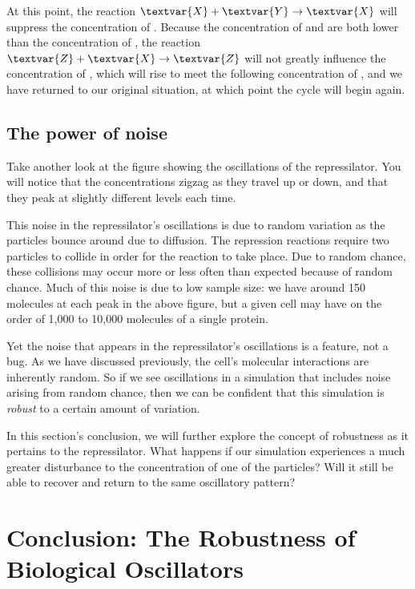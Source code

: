 At this point, the reaction $\textvar{X} + \textvar{Y} \rightarrow \textvar{X}$ will suppress the concentration of . Because the concentration of  and  are both lower than the concentration of , the reaction $\textvar{Z} + \textvar{X} \rightarrow \textvar{Z}$ will not greatly influence the concentration of , which will rise to meet the following concentration of , and we have returned to our original situation, at which point the cycle will begin again.

\FloatBarrier
{}
\subsection{The power of noise}

Take another look at the figure showing the oscillations of the repressilator. You will notice that the concentrations zigzag as they travel up or down, and that they peak at slightly different levels each time.

This noise in the repressilator's oscillations is due to random variation as the particles bounce around due to diffusion. The repression reactions require two particles to collide in order for the reaction to take place. Due to random chance, these collisions may occur more or less often than expected because of random chance. Much of this noise is due to low sample size: we have around 150 molecules at each peak in the above figure, but a given cell may have on the order of 1,000 to 10,000 molecules of a single protein.

Yet the noise that appears in the repressilator's oscillations is a feature, not a bug. As we have discussed previously, the cell's molecular interactions are inherently random. So if we see oscillations in a simulation that includes noise arising from random chance, then we can be confident that this simulation is \textit{robust} to a certain amount of variation.

In this section's conclusion, we will further explore the concept of robustness as it pertains to the repressilator. What happens if our simulation experiences a much greater disturbance to the concentration of one of the particles?  Will it still be able to recover and return to the same oscillatory pattern?\\

\FloatBarrier
{}

\section{Conclusion: The Robustness of Biological Oscillators}
\label{sec:biological_oscillators_must_be_robust}

